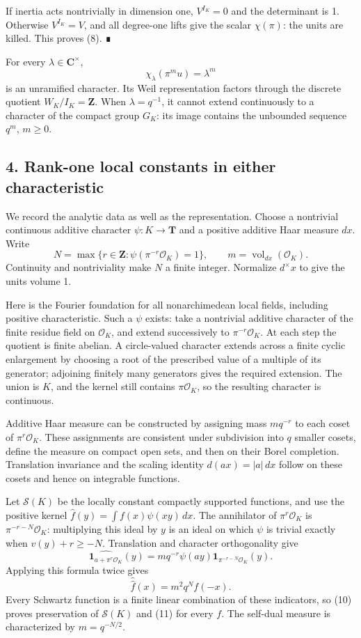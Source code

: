\documentclass[11pt,a4paper]{article}
\begin{document}
If inertia acts nontrivially in dimension one, \(V^{I_K}=0\) and the
determinant is 1. Otherwise \(V^{I_K}=V\), and all degree-one lifts give
the scalar \(\chi(\pi)\): the units are killed. This proves (8). ∎

For every \(\lambda\in\mathbf C^\times\), \[
\chi_\lambda(\pi^m u)=\lambda^m
\] is an unramified character. Its Weil representation factors through
the discrete quotient \(W_K/I_K=\mathbf Z\). When \(\lambda=q^{-1}\), it
cannot extend continuously to a character of the compact group \(G_K\):
its image contains the unbounded sequence \(q^m\), \(m\geq0\).

\subsection{4. Rank-one local constants in either
characteristic}\label{rank-one-local-constants-in-either-characteristic}

We record the analytic data as well as the representation. Choose a
nontrivial continuous additive character \(\psi:K\to\mathbf T\) and a
positive additive Haar measure \(dx\). Write \[
N=\max\{r\in\mathbf Z:\psi(\pi^{-r}\mathcal O_K)=1\},
\qquad m=\operatorname{vol}_{dx}(\mathcal O_K).
\tag{9}
\] Continuity and nontriviality make \(N\) a finite integer. Normalize
\(d^\times x\) to give the units volume 1.

Here is the Fourier foundation for all nonarchimedean local fields,
including positive characteristic. Such a \(\psi\) exists: take a
nontrivial additive character of the finite residue field on
\(\mathcal O_K\), and extend successively to \(\pi^{-r}\mathcal O_K\).
At each step the quotient is finite abelian. A circle-valued character
extends across a finite cyclic enlargement by choosing a root of the
prescribed value of a multiple of its generator; adjoining finitely many
generators gives the required extension. The union is \(K\), and the
kernel still contains \(\pi\mathcal O_K\), so the resulting character is
continuous.

Additive Haar measure can be constructed by assigning mass \(m q^{-r}\)
to each coset of \(\pi^r\mathcal O_K\). These assignments are consistent
under subdivision into \(q\) smaller cosets, define the measure on
compact open sets, and then on their Borel completion. Translation
invariance and the scaling identity \(d(ax)=|a|\,dx\) follow on these
cosets and hence on integrable functions.

Let \(\mathcal S(K)\) be the locally constant compactly supported
functions, and use the positive kernel
\(\widehat f(y)=\int f(x)\psi(xy)\,dx\). The annihilator of
\(\pi^r\mathcal O_K\) is \(\pi^{-r-N}\mathcal O_K\): multiplying this
ideal by \(y\) is an ideal on which \(\psi\) is trivial exactly when
\(v(y)+r\geq-N\). Translation and character orthogonality give \[
\widehat{\mathbf1_{a+\pi^r\mathcal O_K}}(y)
=m q^{-r}\psi(ay)\mathbf1_{\pi^{-r-N}\mathcal O_K}(y).
\tag{10}
\] Applying this formula twice gives \[
\widehat{\widehat f}(x)=m^2q^N f(-x).
\tag{11}
\] Every Schwartz function is a finite linear combination of these
indicators, so (10) proves preservation of \(\mathcal S(K)\) and (11)
for every \(f\). The self-dual measure is characterized by
\(m=q^{-N/2}\).
\end{document}
